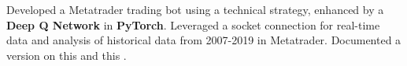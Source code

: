 \item{Developed a Metatrader trading bot using a technical strategy, enhanced by a \textbf{Deep Q Network} in \textbf{PyTorch}. Leveraged a socket connection for real-time data and analysis of historical data from 2007-2019 in Metatrader. Documented a version on this  and this .}

